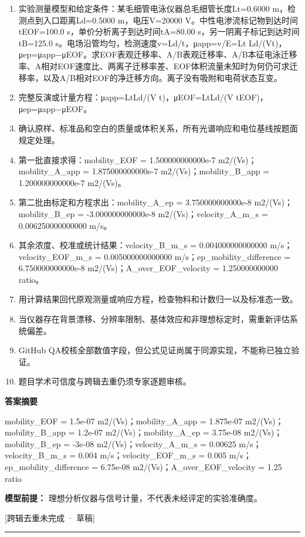 \documentclass[UTF8,11pt,a4paper]{ctexart}
\begin{document}
\begin{enumerate}
\item 实验测量模型和给定条件：某毛细管电泳仪器总毛细管长度Lt=0.6000 m，检测点到入口距离Ld=0.5000 m，电压V=20000 V。中性电渗流标记物到达时间tEOF=100.0 s，单价分析离子到达时间tA=80.00 s，另一阴离子标记到达时间tB=125.0 s。电场沿管均匀，检测速度v=Ld/t，μapp=v/E=Lt Ld/(Vt)，μep=μapp−μEOF。求EOF表观迁移率、A/B表观迁移率、A/B本征电泳迁移率、A相对EOF速度比、两离子迁移率差、EOF体积流量未知时为何仍可求迁移率，以及A/B相对EOF的净迁移方向。离子没有吸附和电荷状态互变。
\item 完整反演或计量方程：μapp=LtLd/(V t)，μEOF=LtLd/(V tEOF)，μep=μapp−μEOF。
\item 确认原样、标准品和空白的质量或体积关系，所有光谱响应和电位基线按题面规定处理。
\item 第一批直接求得：mobility\_EOF = 1.500000000000e-7 m2/(Vs)；mobility\_A\_app = 1.875000000000e-7 m2/(Vs)；mobility\_B\_app = 1.200000000000e-7 m2/(Vs)。
\item 第二批由标定和方程求出：mobility\_A\_ep = 3.750000000000e-8 m2/(Vs)；mobility\_B\_ep = -3.000000000000e-8 m2/(Vs)；velocity\_A\_m\_s = 0.006250000000000 m/s。
\item 其余浓度、校准或统计结果：velocity\_B\_m\_s = 0.004000000000000 m/s；velocity\_EOF\_m\_s = 0.005000000000000 m/s；ep\_mobility\_difference = 6.750000000000e-8 m2/(Vs)；A\_over\_EOF\_velocity = 1.250000000000 ratio。
\item 用计算结果回代原观测量或响应方程，检查物料和计数归一以及标准态一致。
\item 当仪器存在背景漂移、分辨率限制、基体效应和非理想标定时，需重新评估系统偏差。
\item GitHub QA校核全部数值字段，但公式见证尚属于同源实现，不能称已独立验证。
\item 题目学术可信度与跨辑去重仍须专家逐题审核。
\end{enumerate}
\noindent\textbf{答案摘要}\par
mobility\_EOF = 1.5e-07 m2/(Vs)；mobility\_A\_app = 1.875e-07 m2/(Vs)；mobility\_B\_app = 1.2e-07 m2/(Vs)；mobility\_A\_ep = 3.75e-08 m2/(Vs)；mobility\_B\_ep = -3e-08 m2/(Vs)；velocity\_A\_m\_s = 0.00625 m/s；velocity\_B\_m\_s = 0.004 m/s；velocity\_EOF\_m\_s = 0.005 m/s；ep\_mobility\_difference = 6.75e-08 m2/(Vs)；A\_over\_EOF\_velocity = 1.25 ratio\par
\noindent\textbf{模型前提：}
理想分析仪器与信号计量，不代表未经评定的实验准确度。\par
\noindent\textcolor{red!65!black}{[跨辑去重未完成 · 草稿]} \par
\medskip\hrule\medskip
{}
\end{document}
